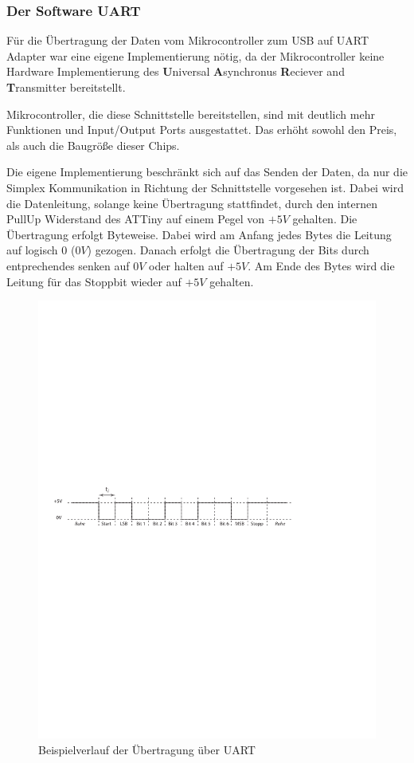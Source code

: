 \documentclass{report}
\begin{document}
\subsubsection{Der Software UART}\label{SoftwareUart}
Für die Übertragung der Daten vom Mikrocontroller zum USB auf UART Adapter war eine eigene Implementierung nötig, da der Mikrocontroller keine Hardware Implementierung des \textbf{U}niversal \textbf{A}synchronus \textbf{R}eciever and \textbf{T}ransmitter bereitstellt.  

Mikrocontroller, die diese Schnittstelle bereitstellen, sind mit deutlich mehr Funktionen und Input/Output Ports ausgestattet. Das erhöht sowohl den Preis, als auch die Baugrö\ss e dieser Chips.

Die eigene Implementierung beschränkt sich auf das Senden der Daten, da nur die Simplex Kommunikation in Richtung der Schnittstelle vorgesehen ist. Dabei wird die Datenleitung, solange keine Übertragung stattfindet, durch den internen PullUp Widerstand des ATTiny auf einem Pegel von $+5V$ gehalten. Die Übertragung erfolgt Byteweise. Dabei wird am Anfang jedes Bytes die Leitung auf logisch $0$ ($0V$) gezogen. Danach erfolgt die Übertragung der Bits durch entprechendes senken auf $0V$ oder halten auf $+5V$. Am Ende des Bytes wird die Leitung für das Stoppbit wieder auf $+5V$ gehalten.

\begin{figure}[!htb]
    \begin{center}
        \includegraphics[width=\textwidth]{Bilder/UART.pdf}
    \end{center}
    \caption{Beispielverlauf der Übertragung über UART}
    \label{UART}
\end{figure}
\end{document}
